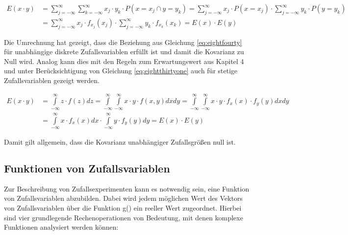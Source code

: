 \begin{equation}\label{eq:eightfourtythree}
\begin{split}
E(x\cdot y) & = \sum _{j=-\infty}^{\infty}\sum _{k=-\infty }^{\infty }x_{j}  \cdot y_{k} \cdot P\left(x=x_{j} \cap y=y_{k} \right) =\sum _{j=-\infty}^{\infty}x_{j}  \cdot P(x=x_{j})\cdot \sum _{j=-\infty}^{\infty}y_{k}  \cdot P(y=y_{k} ) \\ 
& = \sum _{j=-\infty}^{\infty}x_{j}  \cdot f_{x_{j}} \left(x_{j} \right)\cdot \sum _{j=-\infty}^{\infty}y_{k}  \cdot f_{x_{k}} (x_{k})=E(x)\cdot E(y)
\end{split}
\end{equation}

\noindent Die Umrechnung hat gezeigt, dass die Beziehung aus Gleichung \eqref{eq:eightfourty} f\"{u}r unabh\"{a}ngige diskrete Zufallsvariablen erf\"{u}llt ist und damit die Kovarianz zu Null wird. Analog kann dies mit den Regeln zum Erwartungswert aus Kapitel 4 und unter Ber\"{u}cksichtigung von Gleichung \eqref{eq:eightthirtyone} auch f\"{u}r stetige Zufallsvariablen gezeigt werden.

\begin{equation}\label{eq:eightfourtyfour}
\begin{split}
E(x\cdot y) & =\int\limits _{-\infty}^{\infty}z\cdot f(z)  dz=\int\limits _{-\infty}^{\infty}\int\limits _{-\infty }^{\infty}x\cdot y\cdot f(x,y) dxdy=\int\limits _{-\infty }^{\infty}\int\limits _{-\infty}^{\infty}x\cdot y\cdot f_{x} (x)\cdot f_{y} \left(y\right) dxdy \\ 
& = \int\limits _{-\infty}^{\infty}x\cdot f_{x} (x)  dx\cdot \int\limits _{-\infty}^{\infty}y\cdot f_{y} (y)  dy=E(x)\cdot E(y)
\end{split}
\end{equation}

\noindent Damit gilt allgemein, dass die Kovarianz unabh\"{a}ngiger Zufallsgr\"{o}{\ss}en null ist.

\clearpage

\subsection{Funktionen von Zufallsvariablen}

\noindent Zur Beschreibung von Zufallsexperimenten kann es notwendig sein, eine Funktion von Zufallsvariablen abzubilden. Dabei wird jedem m\"{o}glichen Wert des Vektors von Zufallsvariablen  \"{u}ber die Funktion g() ein reeller Wert zugeordnet. Hierbei sind vier grundlegende Rechenoperationen von Bedeutung, mit denen komplexe Funktionen analysiert werden k\"{o}nnen:

